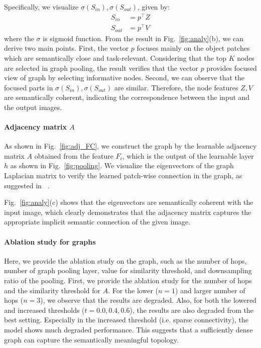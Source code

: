 \documentclass[letterpaper]{article} %
\begin{document}
Specifically, we visualize $\sigma(S_{in}), \sigma(S_{out})$, given by:
\begin{align}
S_{in} &= p^\top Z \\
S_{out} &= p^\top V
\end{align}
where the $\sigma$ is sigmoid function.
From the result in Fig.~\ref{fig:analy}(b), we can derive two main points.
First, the vector $p$ focuses mainly on the object patches which are semantically close and task-relevant.
Considering that the top $K$ nodes are selected in graph pooling, the result verifies that the vector $p$ provides focused view of graph by selecting informative nodes.
Second, we can observe that the focused parts in $\sigma(S_{in}), \sigma(S_{out})$ are similar. Therefore, the node features $Z, V$ are semantically coherent, indicating the correspondence between the input and the output images.




\paragraph{Adjacency matrix $A$}
As shown in Fig.~\ref{fig:adj_FC},
we construct the graph by the learnable adjacency matrix $A$ obtained from the feature $F_i$, which is the output of the learnable layer $h$ as shown in Fig.~\ref{fig:pooling}. We visualize the eigenvectors of the graph Laplacian matrix to verify the learned patch-wise connection in the graph, as suggested in ~\cite{deepSpectral}.

Fig.~\ref{fig:analy}(c) shows that the eigenvectors are semantically coherent with the input image, which clearly demonstrates that the adjacency matrix captures the appropriate implicit semantic connection of the given image.




\paragraph{Ablation study for graphs}
Here, we provide the ablation study on the graph,  such as the number of hops, number of graph pooling layer, value for similarity threshold, and downsampling ratio of the pooling.
First, we provide the ablation study for the number of hops and the similarity threshold for $A$. For the lower ($n=1$) and larger number of hops ($n=3$), we observe that the results are degraded. Also, for both the lowered and increased thresholds ($t=0.0, 0.4, 0.6$), the results are also degraded from the best setting.
Especially in the increased threshold (i.e. sparse connectivity), the model shows much degraded performance.
This suggests that a sufficiently dense graph can capture the semantically meaningful topology.
\end{document}
